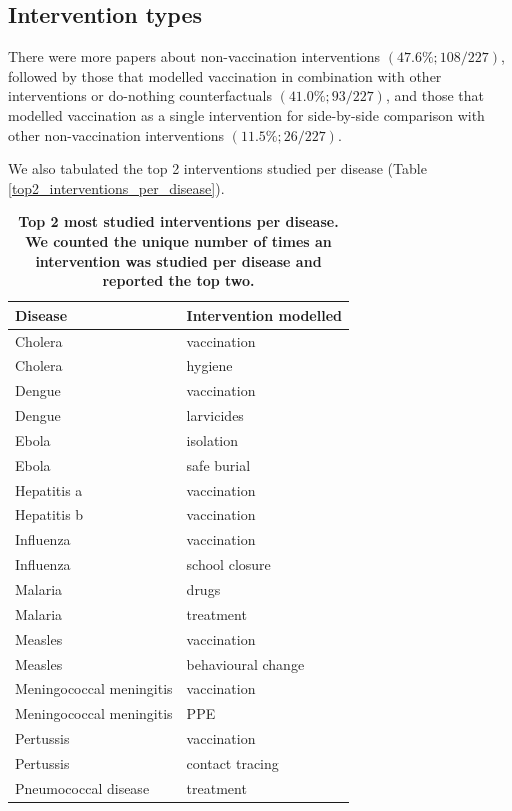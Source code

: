 \documentclass[10pt,letterpaper]{article}
\begin{document}
\subsection*{Intervention types}
There were more papers about non-vaccination interventions $(47.6\%; 108/227)$, followed by those that modelled vaccination in combination with other interventions or do-nothing counterfactuals $(41.0\%; 93/227)$, and those that modelled vaccination as a single intervention for side-by-side comparison with other non-vaccination interventions $(11.5\%; 26/227)$. 

We also tabulated the top 2 interventions studied per disease (Table \ref{top2_interventions_per_disease}).


\begin{table}
	\setlength\arrayrulewidth{1pt} 
	\centering
	\caption{\bf Top 2 most studied interventions per disease. We counted the unique number of times an intervention was studied per disease and reported the top two.}
		\begin{tabular}{| l | l |}
			\hline
			\textbf{Disease} & \textbf{Intervention modelled} \\ \hline
			Cholera & vaccination \\ \hline
			Cholera & hygiene \\ \hline
			Dengue & vaccination \\ \hline
			Dengue & larvicides \\ \hline
			Ebola & isolation \\ \hline
			Ebola & safe burial \\ \hline
			Hepatitis a & vaccination \\ \hline
			Hepatitis b & vaccination \\ \hline
			Influenza & vaccination \\ \hline
			Influenza & school closure \\ \hline
			Malaria & drugs \\ \hline
			Malaria & treatment \\ \hline
			Measles & vaccination \\ \hline
			Measles & behavioural change \\ \hline
			Meningococcal meningitis & vaccination \\ \hline
			Meningococcal meningitis & PPE \\ \hline
			Pertussis & vaccination \\ \hline
			Pertussis & contact tracing \\ \hline
			Pneumococcal disease & treatment \\ \hline

\end{tabular}
\end{table}
\end{document}
